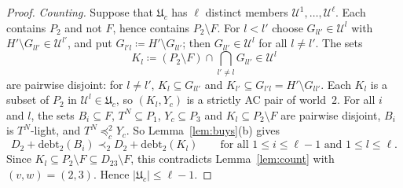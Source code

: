 \documentclass[11pt]{article}
\theoremstyle{definition}\newtheorem{definition}[theorem]{Definition}
\theoremstyle{remark}\newtheorem{remark}[theorem]{Remark}
\newcommand{\debt}{\mathrm{debt}}
\newcommand{\Uf}{\mathcal U}
\newcommand{\UU}{\mathfrak U}
\begin{document}
\begin{proof}
\emph{Counting.} Suppose that $\UU_c$ has $\ell$ distinct members
$\Uf^1,\dots,\Uf^\ell$. Each contains $P_2$ and not $F$, hence contains
$P_2\setminus F$. For $l<l'$ choose $G_{ll'}\in\Uf^l$ with
$H'\setminus G_{ll'}\in\Uf^{l'}$, and put $G_{l'l}\coloneqq H'\setminus
G_{ll'}$; then $G_{ll'}\in\Uf^l$ for all $l\ne l'$. The sets
\[
 K_l\coloneqq(P_2\setminus F)\cap\bigcap_{l'\ne l}G_{ll'}\in\Uf^l
\]
are pairwise disjoint: for $l\ne l'$, $K_l\subseteq G_{ll'}$ and
$K_{l'}\subseteq G_{l'l}=H'\setminus G_{ll'}$. Each $K_l$ is a subset of
$P_2$ in $\Uf^l\in\UU_c$, so $(K_l,Y_c)$ is a strictly AC pair of world~$2$.
For all $i$ and $l$, the sets $B_i\subseteq F$, $T^N\subseteq P_1$,
$Y_c\subseteq P_3$ and $K_l\subseteq P_2\setminus F$ are pairwise disjoint,
$B_i$ is $T^N$-light, and $T^N\preceq^2_cY_c$. So Lemma~\ref{lem:buys}(b)
gives
\[
 D_2+\debt_2(B_i)\prec_2D_2+\debt_2(K_l)\qquad
 \text{for all }1\le i\le\ell-1\text{ and }1\le l\le\ell.
\]
Since $K_l\subseteq P_2\setminus F\subseteq D_{23}\setminus F$, this
contradicts Lemma~\ref{lem:count} with $(v,w)=(2,3)$. Hence
$|\UU_c|\le\ell-1$.
\end{proof}
\end{document}

